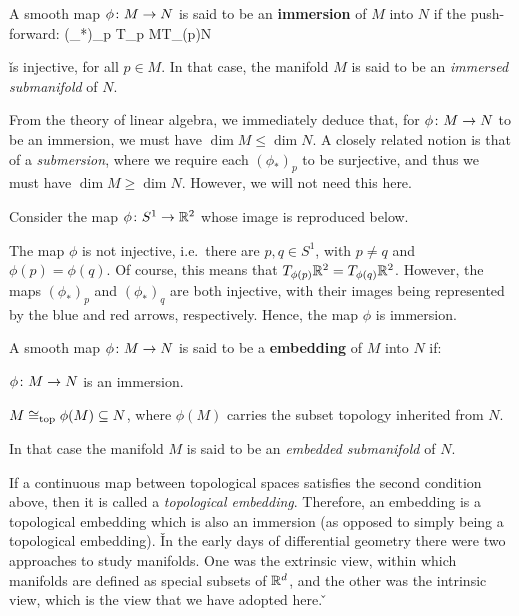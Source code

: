 \bd [Immersion]
A smooth map $\phi\colon M \to N$ is said to be an \textbf{immersion} of $M$ into $N$ if the push-forward:
\bse
(\phi_*)_p \cl T_p M\xrightarrow{\sim}T_{\phi(p)}N
\ese

\v

is injective, for all $p\in M$. In that case, the manifold $M$ is said to be an \emph{immersed submanifold} of $N$.
\ed

From the theory of linear algebra, we immediately deduce that, for $\phi\colon M\to N$ to be an immersion, we must have
$\dim M \leq \dim N$. A closely related notion is that of a \emph{submersion}, where we require each $(\phi_*)_p$ to
be surjective, and thus we must have $\dim M \geq \dim N$. However, we will not need this here.

\be
Consider the map $\phi\colon S^1\to \mathbb{R}^2$ whose image is reproduced below.

\vspace{10pt}

\ee

\vspace{10pt}

The map $\phi$ is not injective, i.e.\ there are $p,q\in S^1$, with $p\neq q$ and $\phi(p)=\phi(q)$. Of course, this
means that $T_{\phi(p)}\mathbb{R}^2=T_{\phi(q)}\mathbb{R}^2$. However, the maps $(\phi_*)_p$ and $(\phi_*)_q$ are both injective,
with their images being represented by the blue and red arrows, respectively. Hence, the map $\phi$ is immersion.

\bd [Embedding]
A smooth map $\phi\colon M \to N$ is said to be a \textbf{embedding} of $M$ into $N$ if:
\bit
\item $\phi\colon M\to N$ is an immersion.
\item $M \cong_{\mathrm{top}}\phi(M)\subseteq N$, where $\phi(M)$ carries the subset topology inherited from $N$.
\eit

In that case the manifold $M$ is said to be an \emph{embedded submanifold} of $N$.
\ed

If a continuous map between topological spaces satisfies the second condition above, then it is called a
\emph{topological embedding}. Therefore, an embedding is a topological embedding which is also an immersion (as
opposed to simply being a topological embedding). \v

In the early days of differential geometry there were two approaches to study manifolds. One was the extrinsic view,
within which manifolds are defined as special subsets of $\mathbb{R}^d$, and the other was the intrinsic view, which is the
view that we have adopted here. \v

